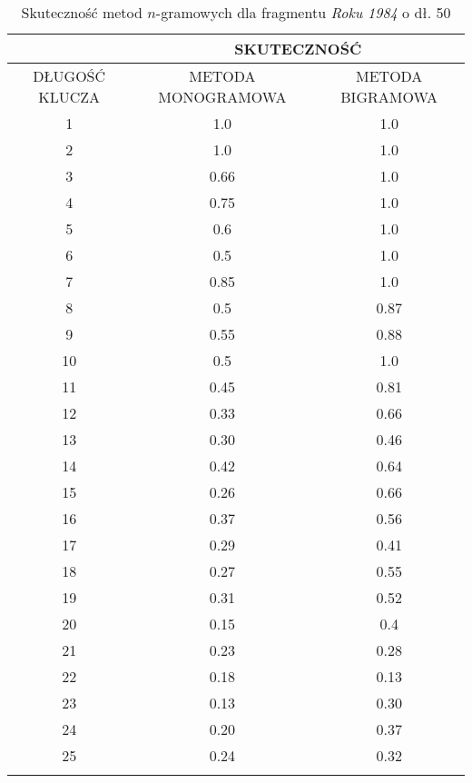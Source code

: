 \documentclass[a4paper]{article}
\theoremstyle{defn}
\theoremstyle{theorem}
\theoremstyle{lemma}
\theoremstyle{cor}
\theoremstyle{fact}
\begin{document}
\begin{center}\begin{longtable}{
|c|c|c|}
\hline   &\multicolumn{2}{|c|}{SKUTECZNOŚĆ} \\
\hline DŁUGOŚĆ KLUCZA & METODA MONOGRAMOWA & METODA BIGRAMOWA\\ \hline
1
 & 1.0 & 1.0\\ \hline
2
 & 1.0 & 1.0\\ \hline
3
 & 0.66 & 1.0\\ \hline
4
 & 0.75 & 1.0\\ \hline
5
 & 0.6 & 1.0\\ \hline
6
 & 0.5 & 1.0\\ \hline
7
 & 0.85 & 1.0\\ \hline
8
 & 0.5 & 0.87\\ \hline
9
 & 0.55 & 0.88\\ \hline
10
 & 0.5 & 1.0\\ \hline
11
 & 0.45 & 0.81\\ \hline
12
 & 0.33 & 0.66\\ \hline
13
 & 0.30 & 0.46\\ \hline
14
 & 0.42 & 0.64\\ \hline
15
 & 0.26 & 0.66\\ \hline
16
 & 0.37 & 0.56\\ \hline
17
 & 0.29 & 0.41\\ \hline
18
 & 0.27 & 0.55\\ \hline
19
 & 0.31 & 0.52\\ \hline
20
 & 0.15 & 0.4\\ \hline
21
 & 0.23 & 0.28\\ \hline
22
 & 0.18 & 0.13\\ \hline
23
 & 0.13 & 0.30\\ \hline
24
 & 0.20 & 0.37\\ \hline
25
 & 0.24 & 0.32\\ \hline
 \caption{Skuteczność metod $n$-gramowych dla fragmentu \textit{Roku 1984} o dł. 50}
\end{longtable}\end{center}
\end{document}
